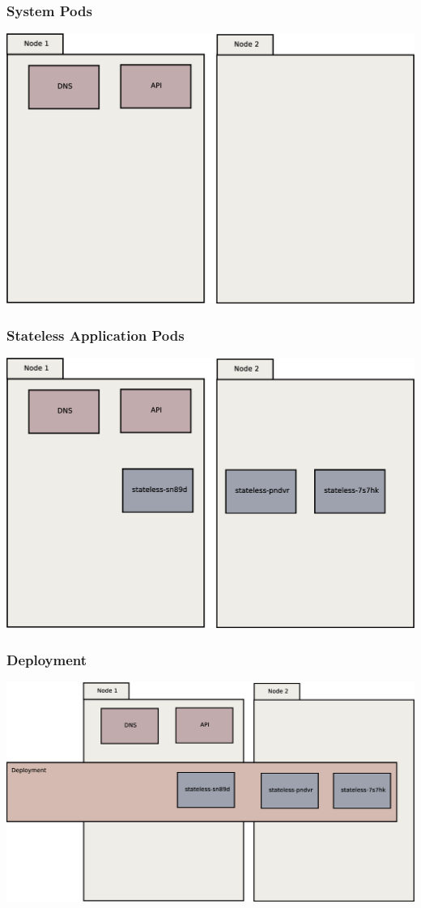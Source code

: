 \documentclass{beamer}
\begin{document}
\begin{frame}
\frametitle{System Pods}
\includegraphics[width=\textwidth,height=\textheight,keepaspectratio]{graphics/01-systemPods.eps}
\end{frame}

\begin{frame}
\frametitle{Stateless Application Pods}
\includegraphics[width=\textwidth,height=\textheight,keepaspectratio]{graphics/02-statelessAppPods.eps}
\end{frame}

\begin{frame}
\frametitle{Deployment}
\includegraphics[width=\textwidth,height=\textheight,keepaspectratio]{graphics/03-deployment.eps}
\end{frame}
\end{document}
